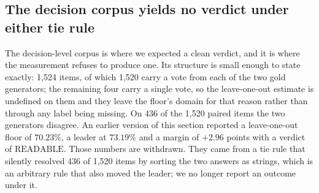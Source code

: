 \documentclass{article}
\begin{document}
\subsection{The decision corpus yields no verdict under either tie rule}
\label{sec:unreadable} The decision-level corpus is where we expected a clean verdict, and it is where the measurement refuses to produce one. Its structure is small enough to state exactly: 1,524 items, of which 1,520 carry a vote from each of the two gold generators; the remaining four carry a single vote, so the leave-one-out estimate is undefined on them and they leave the floor's domain for that reason rather than through any label being missing. On 436 of the 1,520 paired items the two generators disagree. An earlier version of this section reported a leave-one-out floor of $70.23\%$, a leader at $73.19\%$ and a margin of $+2.96$ points with a verdict of $\mathrm{READABLE}$. Those numbers are withdrawn. They came from a tie rule that silently resolved 436 of 1,520 items by sorting the two answers as strings, which is an arbitrary rule that also moved the leader; we no longer report an outcome under it.
\end{document}
